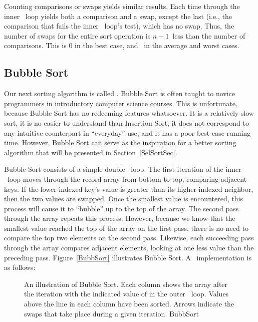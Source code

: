 Counting comparisons or swaps yields similar results.
Each time through the inner \Cfor\ loop yields both a comparison and a
swap, except the last (i.e., the comparison that fails the inner
\Cfor\ loop's test), which has no swap.
Thus, the number of swaps for the entire sort operation is
\(n-1\)~less than the number of comparisons.
This is 0 in the best case, and \Thetantwo\ in the average and
worst cases.

\subsection{Bubble Sort}

Our next sorting algorithm is called .
Bubble Sort is often taught to novice programmers in
introductory computer science courses.
This is unfortunate, because Bubble Sort has no redeeming features
whatsoever.
It is a relatively slow sort, it is no easier to understand than
Insertion Sort, it does not correspond to any intuitive counterpart in
``everyday'' use, and it has a poor best-case running time.
However, Bubble Sort can serve as the inspiration for a better sorting
algorithm that will be presented in Section~\ref{SelSortSec}.

Bubble Sort consists of a simple double \Cfor\ loop.
The first iteration of the inner \Cfor\ loop moves
through the record array from bottom to top, comparing adjacent keys.
If the lower-indexed key's value is greater than its higher-indexed
neighbor, then the two values are swapped.
Once the smallest value is encountered, this process will cause it
to ``bubble'' up to the top of the array.
The second pass through the array repeats this process.
However, because we know that the smallest value reached the top
of the array on the first pass, there is no need to compare the top
two elements on the second pass.
Likewise, each succeeding pass through the array compares adjacent
elements, looking at one less value than the preceding pass.
Figure~\ref{BubbSort} illustrates Bubble Sort.
A \Lang\ implementation is as follows:


\begin{figure}
\vspace{-\medskipamount}

{An illustration of Bubble Sort.
Each column shows the array after the iteration with the indicated
value of  in the outer \Cfor\ loop.
Values above the line in each column have been sorted.
Arrows indicate the swaps that take place during a given iteration.}
{BubbSort}
\bigskip
\end{figure}

